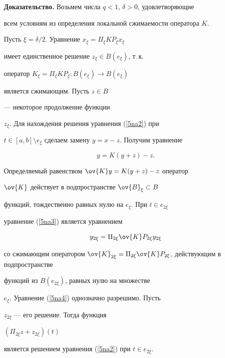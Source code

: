 {\bf Доказательство.} Возьмем числа $q<1$, $\delta>0$, удовлетворяющие


всем условиям из определения локальной сжимаемости оператора $K$.


Пусть $\xi={\delta}/{2}$. Уравнение $x_{\xi}=\Pi_{\xi} K P_{\xi}x_{\xi}$


имеет единственное решение $z_{\xi}\in B (e_{\xi})$, т.\,к.


оператор $K_{\xi}=\Pi_{\xi} K P_{\xi} :B (e_{\xi}) \to B (e_{\xi})$


является сжимающим. Пусть $z \in B$


--- некоторое продолжение функции


$z_{\xi}$. Для нахождения решения уравнения (\ref{5na2}) при


$t \in [a,b]\setminus e_{\xi}$ сделаем замену $y=x - z$. Получим уравнение


\begin{equation}\label{5na3}


y=K(y+z)-z.


\end{equation}


Определяемый равенством $\ov{K}y=K(y+z)-z$ оператор


$\ov{K}$ действует в подпространстве $\ov{B}_{\xi}\subset B$


функций, тождественно равных нулю на $e_{\xi}$. При $t \in e_{2 \xi}$


уравнение (\ref{5na3}) является уравнением


\begin{equation}\label{5na4}


y_{2 \xi}= \Pi_{2 \xi} \ov{K} P_{2 \xi} y_{2 \xi}


\end{equation}


со сжимающим оператором $\ov{K}_{2 \xi}=\Pi_{2 \xi}


\ov{K} P_{2 \xi}$, действующим в подпространстве


функций из $B (e_{2 \xi})$,  равных нулю на множестве


$e_{\xi}$. Уравнение (\ref{5na4}) однозначно разрешимо. Пусть


$z_{2 \xi}$ --- его решение. Тогда функция


$(\Pi_{2 \xi} z+z_{2 \xi}) (t)$


является решением уравнения (\ref{5na2}) при $t \in e_{2 \xi}$.





